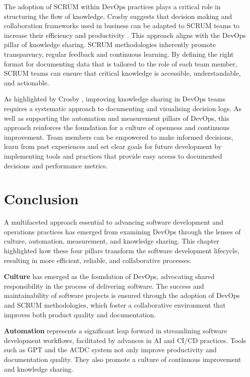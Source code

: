 The adoption of SCRUM within DevOps practices plays a critical role in structuring the flow of knowledge. Crosby suggests that decision making and collaboration frameworks used in business can be adapted to SCRUM teams to increase their efficiency and productivity \cite{Crosby2023}. This approach aligns with the DevOps pillar of knowledge sharing. SCRUM methodologies inherently promote transparency, regular feedback and continuous learning. By defining the right format for documenting data that is tailored to the role of each team member, SCRUM teams can ensure that critical knowledge is accessible, understandable, and actionable.

As highlighted by Crosby \cite{Crosby2023}, improving knowledge sharing in DevOps teams requires a systematic approach to documenting and visualising decision logs. As well as supporting the automation and measurement pillars of DevOps, this approach reinforces the foundation for a culture of openness and continuous improvement. Team members can be empowered to make informed decisions, learn from past experiences and set clear goals for future development by implementing tools and practices that provide easy access to documented decisions and performance metrics.

\section{Conclusion}

A multifaceted approach essential to advancing software development and operations practices has emerged from examining DevOps through the lenses of culture, automation, measurement, and knowledge sharing. This chapter highlighted how these four pillars transform the software development lifecycle, resulting in more efficient, reliable, and collaborative processes.

\textbf{Culture} has emerged as the foundation of DevOps, advocating shared responsibility in the process of delivering software. The success and maintainability of software projects is ensured through the adoption of DevOps and SCRUM methodologies, which foster a collaborative environment that improves both product quality and documentation.

\textbf{Automation} represents a significant leap forward in streamlining software development workflows, facilitated by advances in AI and CI/CD practices. Tools such as GPT and the ACDC system not only improve productivity and documentation quality. They also promote a culture of continuous improvement and knowledge sharing.

